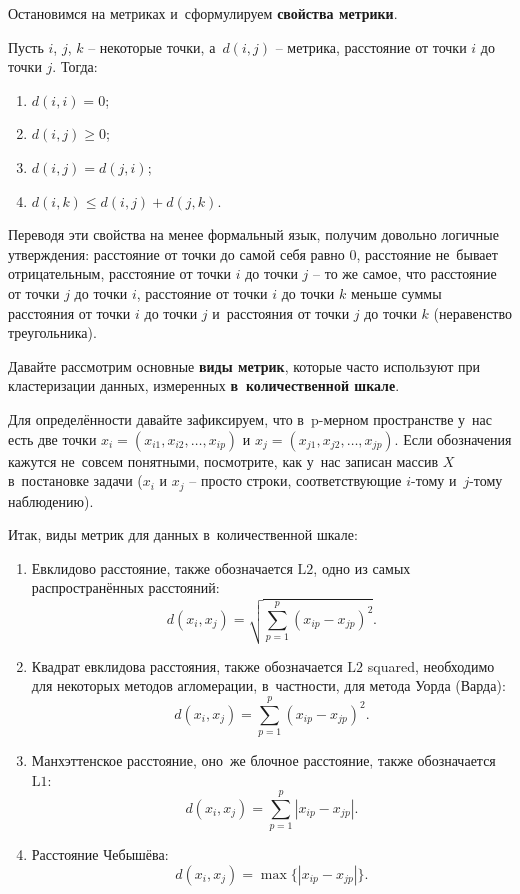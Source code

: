 \documentclass[12pt,a4paper]{article}
\theoremstyle{definition}
\begin{document}
Остановимся на метриках и~сформулируем \textbf{свойства метрики}.

Пусть $i$, $j$, $k$ – некоторые точки, а~$d(i, j)$ – метрика, расстояние 
от точки $i$ до точки $j$. Тогда:

\begin{enumerate}
\item $d(i, i) = 0$;
\item $d(i, j) \geqslant 0$;
\item $d(i, j) = d(j, i)$;
\item $d(i, k) \leqslant d(i, j) + d(j, k)$.
\end{enumerate}

Переводя эти свойства на менее формальный язык, получим довольно логичные утверждения: 
расстояние от точки до самой себя равно $0$, расстояние не~бывает отрицательным, расстояние 
от точки $i$ до точки $j$ – то же самое, что расстояние от точки $j$ до точки $i$, 
расстояние от точки $i$ до точки $k$ меньше суммы расстояния от точки $i$ до точки $j$ 
и~расстояния от точки $j$ до точки $k$ (неравенство треугольника).

Давайте рассмотрим основные \textbf{виды метрик}, которые часто используют при 
кластеризации данных, измеренных \textbf{в~количественной шкале}.

Для определённости давайте зафиксируем, что в~$\text{p}$-мерном пространстве у~нас 
есть две точки $x_i = (x_{i1}, x_{i2}, \dots, x_{ip})$ и $x_j = (x_{j1}, x_{j2}, \dots, x_{jp})$. 
Если обозначения кажутся не~совсем понятными, посмотрите, как у~нас записан массив $X$
в~постановке задачи ($x_i$ и $x_j$ – просто строки, соответствующие $i$-тому 
и~$j$-тому наблюдению). 

Итак, виды метрик для данных в~количественной шкале:

\begin{enumerate}
\item Евклидово расстояние, также обозначается $\text{L2}$, одно из самых 
распространённых расстояний:
$$
d(x_i, x_j) = \sqrt{\sum_{p=1}^{p} (x_{ip} - x_{jp}) ^2}.
$$
\item Квадрат евклидова расстояния, также обозначается $\text{L2}$ squared, 
необходимо для некоторых методов агломерации, в~частности, для метода Уорда (Варда):
$$
d(x_i, x_j) = \sum_{p=1}^{p} (x_{ip} - x_{jp}) ^2.
$$
\item Манхэттенское расстояние, оно~же блочное расстояние, также обозначается $\text{L1}$:
$$
d(x_i, x_j) = \sum_{p=1}^{p} |x_{ip} - x_{jp}|.
$$
\item Расстояние Чебышёва:
$$
d(x_i, x_j) = \max\{|x_{ip} - x_{jp}|\}.
$$
\end{enumerate}
\end{document}
